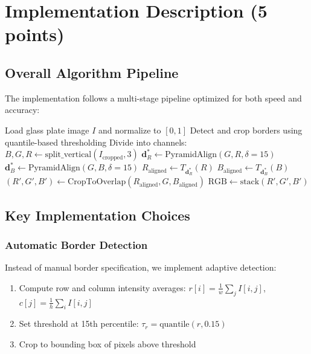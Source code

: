 \documentclass[11pt]{article}
\begin{document}
\section{Implementation Description (5 points)}

\subsection{Overall Algorithm Pipeline}

The implementation follows a multi-stage pipeline optimized for both speed and accuracy:

\begin{algorithm}
\caption{Image Pyramid Alignment Algorithm}
\begin{algorithmic}[1]
\State Load glass plate image $I$ and normalize to $[0,1]$
\State Detect and crop borders using quantile-based thresholding
\State Divide into channels: $B, G, R \leftarrow \text{split\_vertical}(I_{\text{cropped}}, 3)$
\State $\mathbf{d}_R^* \leftarrow \text{PyramidAlign}(G, R, \delta=15)$
\State $\mathbf{d}_B^* \leftarrow \text{PyramidAlign}(G, B, \delta=15)$
\State $R_{\text{aligned}} \leftarrow T_{\mathbf{d}_R^*}(R)$
\State $B_{\text{aligned}} \leftarrow T_{\mathbf{d}_B^*}(B)$
\State $(R', G', B') \leftarrow \text{CropToOverlap}(R_{\text{aligned}}, G, B_{\text{aligned}})$
\State \Return $\text{RGB} \leftarrow \text{stack}(R', G', B')$
\end{algorithmic}
\end{algorithm}

\subsection{Key Implementation Choices}

\subsubsection{Automatic Border Detection}

Instead of manual border specification, we implement adaptive detection:

\begin{enumerate}
\item Compute row and column intensity averages: $r[i] = \frac{1}{w}\sum_j I[i,j]$, $c[j] = \frac{1}{h}\sum_i I[i,j]$
\item Set threshold at 15th percentile: $\tau_r = \text{quantile}(r, 0.15)$
\item Crop to bounding box of pixels above threshold
\end{enumerate}
\end{document}
